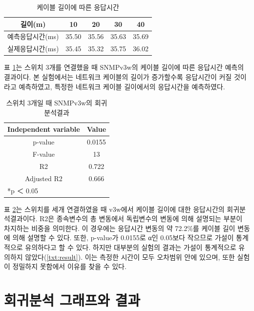 \documentclass[11pt
  , a4paper
  , article
  , oneside
]{memoir}
\begin{document}
\begin{table}[h!]
\begin{center}
\begin{tabular}{c|c|c|c|c}\hline
길이(m) & 10 & 20 & 30 & 40 \\ \hline
예측응답시간(ms)& 35.50 & 35.56 & 35.63 & 35.69 \\ \hline
실제응답시간(ms)& 35.45 & 35.32 & 35.75 & 36.02 \\ \hline
\end{tabular}
\caption{케이블 길이에 따른 응답시간}
  \label{table:predict_time}  
\end{center}
\end{table} 

표 \ref{table:predict_time}는 스위치 3개를 연결했을 때 SNMPv3w의 케이블 길이에 따른 응답시간 예측의 결과이다. 
본 실험에서는 네트워크 케이블의 길이가 증가할수록 응답시간이 커질 것이라고 예측하였고, 특정한 네트워크 케이블 길이에서의 응답시간을 예측하였다. 

\begin{table}[h!]
\begin{center}
\begin{tabular}{c|c}\hline
Independent variable & Value  \\ \hline\hline
p-value &  0.0155\\ 
F-value &  13\\ 
R2 &  0.722\\ 
Adjusted R2 & 0.666 \\ \hline
\multicolumn{2}{l}{*p ＜ 0.05} \\ \hline\hline
\end{tabular}
\caption{스위치 3개일 때 SNMPv3w의 회귀분석결과}
  \label{table:regression}  
\end{center}
\end{table} 

표 \ref{table:regression}는 스위치를 세개 연결하였을 때 v3w에서 케이블 길이에 대한 응답시간의 회귀분석결과이다. R2은 종속변수의 총 변동에서 독립변수의 변동에 의해 설명되는 부분이 차지하는 비중을 의미한다. 이 경우에는 응답시간 변동의 약 72.2\%를 케이블 길이 변동에 의해 설명할 수 있다. 또한, p-value가 0.0155로 α인 0.05보다 작으므로 가설이 통계적으로 유의하다고 할 수 있다. 하지만 대부분의 실험의 결과는 가설이 통계적으로 유의하지 않았다(\ref{txt:result}). 이는 측정한 시간이 모두 오차범위 안에 있으며, 또한 실험이 정밀하지 못함에서 이유를 찾을 수 있다. 

\clearpage
\chapter{회귀분석 그래프와 결과}
\end{document}
